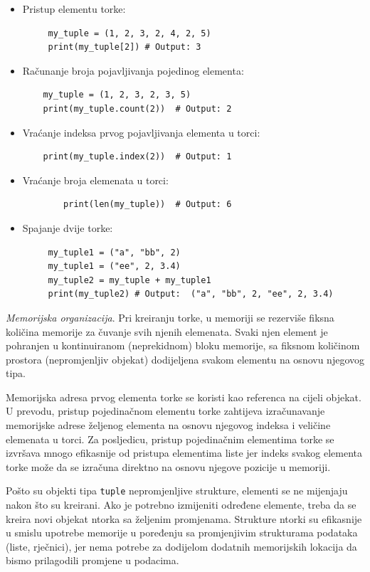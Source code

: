  \begin{itemize}
 	\item Pristup elementu torke:
 	\begin{verbatim}
     my_tuple = (1, 2, 3, 2, 4, 2, 5)
     print(my_tuple[2]) # Output: 3
 	\end{verbatim}
    \item  Računanje broja pojavljivanja pojedinog elementa:
    
	\begin{verbatim}    
    my_tuple = (1, 2, 3, 2, 3, 5)
    print(my_tuple.count(2))  # Output: 2
    	\end{verbatim}
    \item Vraćanje indeksa prvog pojavljivanja elementa u torci:
   	\begin{verbatim}    
    print(my_tuple.index(2))  # Output: 1
   	\end{verbatim}
    \item Vraćanje broja elemenata u torci:
       	\begin{verbatim}    
    	print(len(my_tuple))  # Output: 6
    \end{verbatim}
    \item Spajanje dvije torke:
  	\begin{verbatim}    
     my_tuple1 = ("a", "bb", 2)
     my_tuple1 = ("ee", 2, 3.4)
     my_tuple2 = my_tuple + my_tuple1 
     print(my_tuple2) # Output:  ("a", "bb", 2, "ee", 2, 3.4)
    \end{verbatim}
 \end{itemize}
 
\textit{Memorijska organizacija}.  Pri kreiranju torke, u memoriji se rezerviše fiksna količina memorije za čuvanje svih njenih elemenata. Svaki njen element je pohranjen u kontinuiranom (neprekidnom) bloku memorije, sa fiksnom količinom prostora (nepromjenljiv objekat) dodijeljena svakom elementu na osnovu njegovog tipa.

Memorijska adresa prvog elementa torke se koristi kao referenca na cijeli objekat. U prevodu,  pristup pojedinačnom elementu torke zahtijeva izračunavanje memorijske adrese željenog elementa na osnovu njegovog indeksa i veličine   elemenata u torci. Za posljedicu, pristup pojedinačnim elementima torke se izvršava mnogo efikasnije od pristupa elementima liste jer indeks svakog elementa torke može da se izračuna direktno na osnovu njegove pozicije u memoriji. 

Pošto su objekti tipa \texttt{tuple} nepromjenljive strukture, elementi se ne mijenjaju  nakon što su kreirani. Ako je  potrebno izmijeniti određene elemente, treba da se kreira novi objekat ntorka sa željenim promjenama. Strukture ntorki su  efikasnije u smislu upotrebe memorije u poređenju sa promjenjivim strukturama podataka (liste, rječnici), jer nema potrebe  za dodijelom dodatnih memorijskih lokacija da bismo prilagodili promjene u podacima.
 
